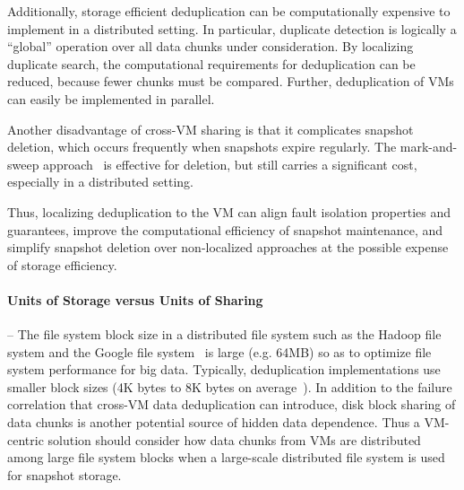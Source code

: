 Additionally, storage efficient deduplication can be computationally expensive
to implement in a distributed setting.  In particular, duplicate detection is
logically a ``global'' operation over all data chunks
under consideration.
By localizing duplicate search, the computational requirements
for deduplication can be reduced, because fewer chunks must be compared.
Further, deduplication of VMs can easily be implemented in
parallel.
 
Another disadvantage of cross-VM sharing is that it complicates 
snapshot deletion, 
which occurs frequently when snapshots expire regularly. 
The mark-and-sweep approach~\cite{Guo2011,Fabiano2013}  is effective for
deletion, but still carries a significant cost, especially in a distributed 
setting.

Thus,
localizing deduplication to the VM can align fault isolation properties and
guarantees, improve the computational efficiency of snapshot maintenance, and
simplify snapshot deletion over non-localized approaches at the possible
expense of storage efficiency.

\paragraph*{Units of Storage versus Units of Sharing} --
The file system block  size in a distributed file system such as  
the Hadoop file system and the Google file system~\cite{googlefs03}
is large (e.g.  64MB) so as to optimize file system performance
for big data.
Typically, deduplication implementations use smaller block sizes (4K bytes to
8K bytes on average~\cite{Jin2009}).
In addition to the failure correlation that cross-VM data deduplication can
introduce, disk block sharing of data chunks is another potential source of
hidden data dependence.
Thus a VM-centric solution should consider how data chunks from VMs are
distributed among large file system blocks when a large-scale distributed file
system is used for snapshot storage.

 

